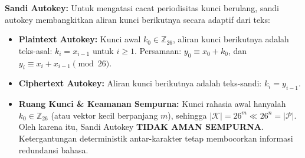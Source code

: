 \documentclass[11pt,a4paper]{article}
\begin{document}
\textbf{Sandi Autokey:} Untuk mengatasi cacat periodisitas kunci berulang, sandi autokey membangkitkan aliran kunci berikutnya secara adaptif dari teks:
\begin{itemize}[leftmargin=*]
    \item \textbf{Plaintext Autokey:} Kunci awal $k_0 \in \mathbb{Z}_{26}$, aliran kunci berikutnya adalah teks-asal: $k_i = x_{i-1}$ untuk $i \ge 1$. Persamaan: $y_0 \equiv x_0 + k_0$, dan $y_i \equiv x_i + x_{i-1} \pmod{26}$.
    \item \textbf{Ciphertext Autokey:} Aliran kunci berikutnya adalah teks-sandi: $k_i = y_{i-1}$.
    \item \textbf{Ruang Kunci \& Keamanan Sempurna:} Kunci rahasia awal hanyalah $k_0 \in \mathbb{Z}_{26}$ (atau vektor kecil berpanjang $m$), sehingga $|\mathcal{K}| = 26^m \ll 26^n = |\mathcal{P}|$. Oleh karena itu, Sandi Autokey \textbf{TIDAK AMAN SEMPURNA}. Ketergantungan deterministik antar-karakter tetap membocorkan informasi redundansi bahasa.
\end{itemize}
\end{document}
